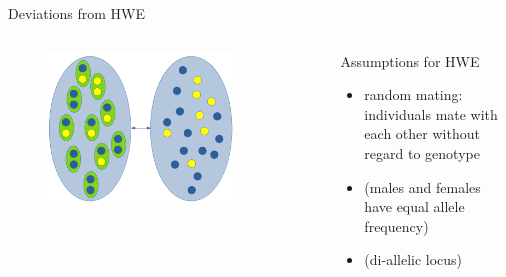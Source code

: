 \begin{frame}{Deviations from HWE}

        \begin{columns}


                \begin{figure}
                        \includegraphics[width=0.8\textwidth]{Pics/alleles2geno}
                \end{figure}


                \small
                \begin{block}{Assumptions for HWE}
                        \begin{itemize}
                                \item random mating: individuals mate with each other without regard to genotype
				\item (males and females have equal allele frequency)
				\item (di-allelic locus)
                        \end{itemize}
                \end{block}

        \end{columns}

\end{frame}


